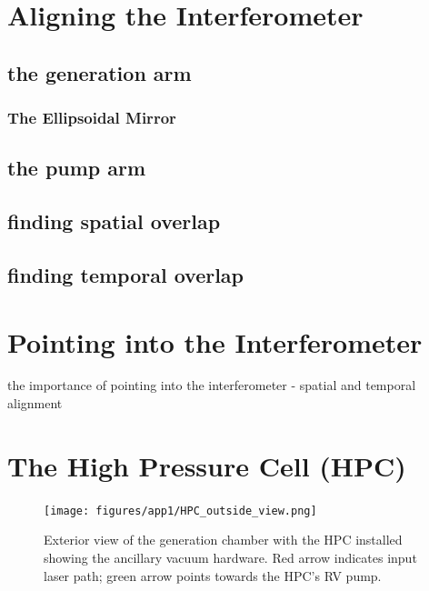 \section{Aligning the Interferometer}
\label{app:aligning-interferometer}

\subsection{the generation arm}

\subsubsection{The Ellipsoidal Mirror}

\subsection{the pump arm}

\subsection{finding spatial overlap}

\subsection{finding temporal overlap}

\section{Pointing into the Interferometer}
\label{app:pointing-into-TABLE}

the importance of pointing into the interferometer - spatial and temporal alignment

\section{The High Pressure Cell (HPC)}

\begin{figure}
	\centering
	\texttt{[image: figures/app1/HPC\_outside\_view.png]}
	\caption{Exterior view of the generation chamber with the HPC installed showing the ancillary vacuum hardware. Red arrow indicates input laser path; green arrow points towards the HPC's RV pump.}
	\label{fig:HPC_outside_view}
\end{figure}

